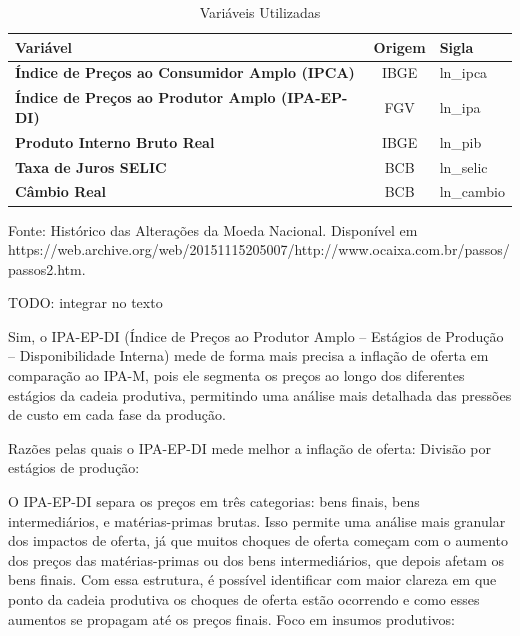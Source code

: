 \documentclass[12pt,oneside,a4paper,chapter=TITLE,english,brazil,sumario=abnt-6027-2012]{abntex2}
\begin{document}
\vspace{0.2cm}
\begin{table}[H]
	\caption{Variáveis Utilizadas}
	\centering
	\begin{tabular}{ | l || c | l | }
		\hline
		\textbf{Variável}                                       & \textbf{Origem} & \textbf{Sigla} \\
		\hline
		\textbf{Índice de Preços ao Consumidor Amplo (IPCA)}    & IBGE            & ln\_ipca       \\
		\textbf{Índice de Preços ao Produtor Amplo (IPA-EP-DI)} & FGV             & ln\_ipa        \\
		\textbf{Produto Interno Bruto Real}                     & IBGE            & ln\_pib        \\
		\textbf{Taxa de Juros SELIC}                            & BCB             & ln\_selic      \\
		\textbf{Câmbio Real}                                    & BCB             & ln\_cambio     \\
		\hline
	\end{tabular}
	\vspace{1ex}
	
	\raggedright{
		\noindent \footnotesize{Fonte: Histórico das Alterações da Moeda Nacional. Disponível em \\ https://web.archive.org/web/20151115205007/http://www.ocaixa.com.br/passos/passos2.htm.}}
\end{table}

\vspace{-0.2cm}
\vspace{0.5cm}

TODO: integrar no texto

Sim, o IPA-EP-DI (Índice de Preços ao Produtor Amplo – Estágios de Produção – Disponibilidade Interna) mede de forma mais precisa a inflação de oferta em comparação ao IPA-M, pois ele segmenta os preços ao longo dos diferentes estágios da cadeia produtiva, permitindo uma análise mais detalhada das pressões de custo em cada fase da produção.

Razões pelas quais o IPA-EP-DI mede melhor a inflação de oferta:
Divisão por estágios de produção:

O IPA-EP-DI separa os preços em três categorias: bens finais, bens intermediários, e matérias-primas brutas. Isso permite uma análise mais granular dos impactos de oferta, já que muitos choques de oferta começam com o aumento dos preços das matérias-primas ou dos bens intermediários, que depois afetam os bens finais.
Com essa estrutura, é possível identificar com maior clareza em que ponto da cadeia produtiva os choques de oferta estão ocorrendo e como esses aumentos se propagam até os preços finais.
Foco em insumos produtivos:
\end{document}
